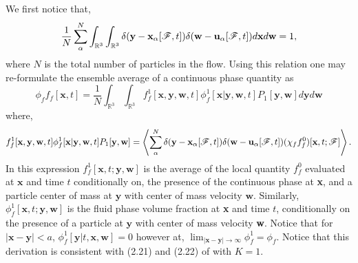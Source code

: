 We first notice that, 
\begin{equation}
    \frac{1}{N}\sum_\alpha^N
    \int_{\mathbb{R}^3}
    \int_{\mathbb{R}^3}
    \delta(\textbf{y}-\textbf{x}_\alpha[\mathscr{F},t])
    \delta(\textbf{w}-\textbf{u}_\alpha[\mathscr{F},t])
    d\textbf{x}
    d\textbf{w}
    = 1,
\end{equation}
where $N$ is the total number of particles in the flow. 
Using this relation one may re-formulate the ensemble average of a continuous phase quantity as 
\begin{equation}
    \phi_f f_f[\textbf{x},t]
    = 
    \frac{1}{N}
    \int_{\mathbb{R}^3}
    \int_{\mathbb{R}^3}
    f_f^1[\textbf{x},\textbf{y},\textbf{w},t] \phi_f^1[\textbf{x}|\textbf{y},\textbf{w},t]  P_1[\textbf{y},\textbf{w}] 
    d\textbf{y} 
    d\textbf{w}
    \label{eq:conditional_averaged_fluid}
\end{equation}
where,
\begin{equation*}
    f_f^1[\textbf{x},\textbf{y},\textbf{w},t] \phi_f^1[\textbf{x}|\textbf{y},\textbf{w},t]  P_1[\textbf{y},\textbf{w}]
    =     
    \left<
    \sum_\alpha^N 
    \delta(\textbf{y}-\textbf{x}_\alpha[\mathscr{F},t])
     \delta(\textbf{w}-\textbf{u}_\alpha[\mathscr{F},t])
    (\chi_f
    f^0_f)[\textbf{x},t;\mathscr{F}]
    \right>.
\end{equation*}
In this expression $f_f^1[\textbf{x},t;\textbf{y},\textbf{w}]$ is the average of the local quantity $f_f^0$ evaluated at $\textbf{x}$ and time $t$ conditionally on, the presence of the continuous phase at \textbf{x}, and a particle center of mass at $\textbf{y}$ with center of mass velocity $\textbf{w}$. 
Similarly, $\phi_f^1[\textbf{x},t;\textbf{y},\textbf{w}]$ is the fluid phase volume fraction at \textbf{x} and time $t$, conditionally on the presence of a particle at $\textbf{y}$ with center of mass velocity \textbf{w}. 
Notice that for $|\textbf{x} - \textbf{y}| < a$, $\phi_f^1[\textbf{y}|t,\textbf{x},\textbf{w}] = 0$ however at, 
$\lim_{|\textbf{x} - \textbf{y}| \to \infty} \phi_f^1 = \phi_f$. 
Notice that this derivation is consistent with (2.21) and (2.22) of \citet{zhang1994ensemble} with $K = 1$. 

